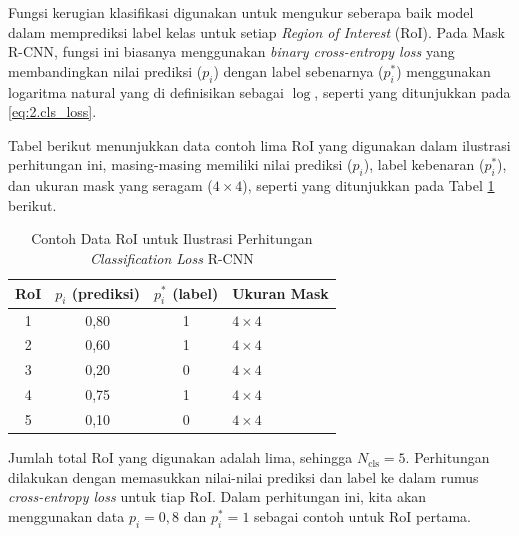 Fungsi kerugian klasifikasi digunakan untuk mengukur seberapa baik model dalam memprediksi label kelas untuk setiap \textit{Region of Interest} (RoI). Pada Mask R-CNN, fungsi ini biasanya menggunakan \textit{binary cross-entropy loss} yang membandingkan nilai prediksi ($p_i$) dengan label sebenarnya ($p_i^*$) menggunakan logaritma natural yang di definisikan sebagai $\log$, seperti yang ditunjukkan pada \ref{eq:2.cls_loss}.  \par


Tabel berikut menunjukkan data contoh lima RoI yang digunakan dalam ilustrasi perhitungan ini, masing-masing memiliki nilai prediksi ($p_i$), label kebenaran ($p_i^*$), dan ukuran mask yang seragam ($4\times4$), seperti yang ditunjukkan pada Tabel \ref{table:3.contoh-data-roi-loss} berikut. \par

\begin{table}[H]
\centering
\caption{Contoh Data RoI untuk Ilustrasi Perhitungan \textit{Classification Loss} R-CNN}
\renewcommand{\arraystretch}{1.3}
\label{table:3.contoh-data-roi-loss}
\begin{tabular}{|c|c|c|>{\centering\arraybackslash}m{2.2cm}|}
\hline
\textbf{RoI} & \textbf{$p_i$ (prediksi)} & \textbf{$p_i^*$ (label)} & \textbf{Ukuran Mask} \\ 
\hline
1 & 0,80 & 1 & $4 \times 4$ \\ 
\hline
2 & 0,60 & 1 & $4 \times 4$ \\ 
\hline
3 & 0,20 & 0 & $4 \times 4$ \\ 
\hline
4 & 0,75 & 1 & $4 \times 4$ \\ 
\hline
5 & 0,10 & 0 & $4 \times 4$ \\ 
\hline
\end{tabular}
\end{table}

Jumlah total RoI yang digunakan adalah lima, sehingga $N_{\text{cls}} = 5$. Perhitungan dilakukan dengan memasukkan nilai-nilai prediksi dan label ke dalam rumus \textit{cross-entropy loss} untuk tiap RoI. Dalam perhitungan ini, kita akan menggunakan data $p_i = 0{,}8$ dan $p_i^* = 1$ sebagai contoh untuk RoI pertama. \par 

